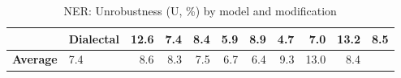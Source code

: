 \begin{table}[h]
{\begin{tabular}{llrrrrrrrrr}
  & \textbf{Dialectal} & \cellcolor{blue!33} 12.6 & \cellcolor{blue!19} 7.4 & \cellcolor{blue!22} 8.4 & \cellcolor{blue!15} 5.9 & \cellcolor{blue!23} 8.9 & \cellcolor{blue!12} 4.7 & \cellcolor{blue!18} 7.0 & \cellcolor{blue!34} 13.2 & \cellcolor{blue!22} 8.5 \\
\midrule
\textbf{Average} &  \cellcolor{blue!19} 7.4 & \cellcolor{blue!22} 8.6 & \cellcolor{blue!21} 8.3 & \cellcolor{blue!19} 7.5 & \cellcolor{blue!17} 6.7 & \cellcolor{blue!16} 6.4 & \cellcolor{blue!24} 9.3 & \cellcolor{blue!33} 13.0 & \cellcolor{blue!22} 8.4 \\
\bottomrule
\end{tabular}}
\caption{NER: Unrobustness (U, \%) by model and modification}\label{tab:ner_unrob}
\end{table}